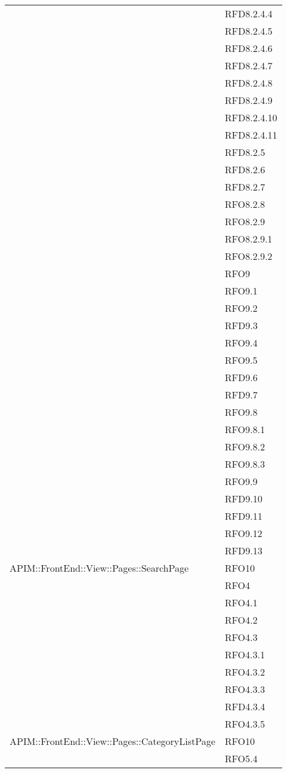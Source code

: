 \begin{longtable}{ p{14cm} | p{2cm} }
			&RFD8.2.4.4\\
			&RFD8.2.4.5\\
			&RFD8.2.4.6\\
			&RFD8.2.4.7\\
			&RFD8.2.4.8\\
			&RFD8.2.4.9\\
			&RFD8.2.4.10\\
			&RFD8.2.4.11\\
			&RFD8.2.5\\
			&RFD8.2.6\\
			&RFD8.2.7\\
			&RFO8.2.8\\
			&RFO8.2.9\\
			&RFO8.2.9.1\\
			&RFO8.2.9.2\\
			&RFO9\\
			&RFO9.1\\
			&RFO9.2\\
			&RFD9.3\\
			&RFO9.4\\
			&RFO9.5\\
			&RFD9.6\\
			&RFD9.7\\
			&RFO9.8\\
			&RFO9.8.1\\
			&RFO9.8.2\\
			&RFO9.8.3\\
			&RFO9.9\\
			&RFD9.10\\
			&RFD9.11\\
			&RFO9.12\\
			&RFD9.13\\
			\hline
		    APIM::FrontEnd::View::Pages::SearchPage& RFO10 \\
		    &RFO4\\
		    &RFO4.1\\
		    &RFO4.2\\
		    &RFO4.3\\
		    &RFO4.3.1\\
		    &RFO4.3.2\\
		    &RFO4.3.3\\
		    &RFD4.3.4\\
		    &RFO4.3.5\\
		    \hline
		    APIM::FrontEnd::View::Pages::CategoryListPage& RFO10 \\
		    &RFO5.4\\
		    

\end{longtable}
